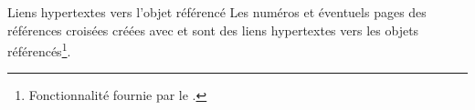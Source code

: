 \documentclass[french,nolocaltoc]{nwejmart}
\newtheorem[style=definition]{fait}
\newtheorem[title=contraventionnalisation]{ctrv}
\newtheorem[title-plural=anneaux]{anneau}
\newtheorem[title-plural=idéaux]{idéal}
\begin{document}
\begin{dbremark}{Liens hypertextes vers l'objet référencé}{}
  Les numéros et éventuels  pages des références croisées
  créées avec  et  sont des liens hypertextes vers les
  objets référencés\footnote{Fonctionnalité fournie par le .}.
\end{dbremark}


%
%
\end{document}
